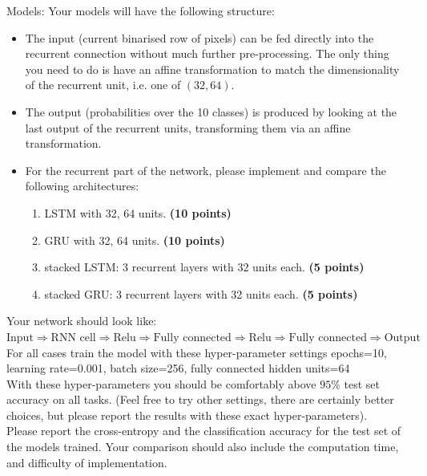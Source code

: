 \documentclass[12pt]{article}
\begin{document}
Models: Your models will have the following structure:\\
\begin{itemize}
\item The input (current binarised row of pixels) can be fed directly into the recurrent connection without much further pre-processing. The only thing you need to do is have an affine transformation to match the dimensionality of the recurrent unit, i.e. one of $(32, 64)$.
\item The output (probabilities over the 10 classes) is produced by looking at the last output of the recurrent units, transforming them via an affine transformation.
\item For the recurrent part of the network, please implement and compare the following architectures:
    \begin{enumerate}[label=(\roman*)]
    \item LSTM with 32, 64 units. \textbf{(10 points)}
    \item GRU with 32, 64 units. \textbf{(10 points)}
    \item stacked LSTM: 3 recurrent layers with 32 units each. \textbf{(5 points)}
    \item stacked GRU: 3 recurrent layers with 32 units each. \textbf{(5 points)}
    \end{enumerate}
\end{itemize}

Your network should look like:\\
$\textrm{Input} \Rightarrow \textrm{RNN cell} \Rightarrow \textrm{Relu} \Rightarrow \textrm{Fully connected} \Rightarrow \textrm{Relu} \Rightarrow \textrm{Fully connected} \Rightarrow \textrm{Output}$ \\ \newline
For all cases train the model with these hyper-parameter settings
epochs=10, learning rate=0.001, batch size=256, fully connected hidden units=64\\ \newline
With these hyper-parameters you should be comfortably above $95\%$ test set accuracy on all tasks. (Feel free to try other settings, there are certainly better choices, but please report the results with these exact hyper-parameters). \\ \newline
Please report the cross-entropy and the classification accuracy for the test set of the models trained. Your comparison should also include the computation time, and difficulty of implementation.
\end{document}
